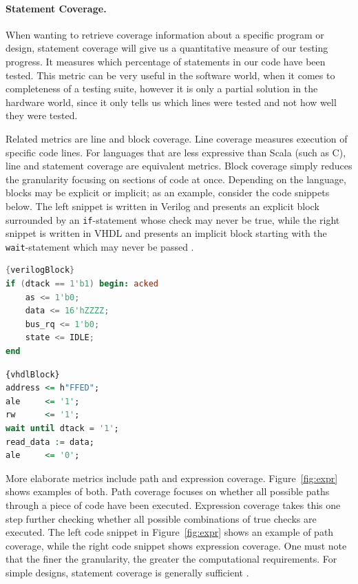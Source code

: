 \documentclass[runningheads]{llncs}
\begin{document}
\paragraph{Statement Coverage.} When wanting to retrieve coverage information about a specific program or design, statement coverage will give us a quantitative measure of our testing progress. It measures which percentage of statements in our code have been tested. This metric can be very useful in the software world, when it comes to completeness of a testing suite, however it is only a partial solution in the hardware world, since it only tells us which lines were tested and not how well they were tested.

Related metrics are line and block coverage. Line coverage measures execution of specific code lines. For languages that are less expressive than Scala (such as C), line and statement coverage are equivalent metrics. Block coverage simply reduces the granularity focusing on sections of code at once. Depending on the language, blocks may be explicit or implicit; as an example, consider the code snippets below. The left snippet is written in Verilog and presents an explicit block surrounded by an \texttt{if}-statement whose check may never be true, while the right snippet is written in VHDL and presents an implicit block starting with the \texttt{wait}-statement which may never be passed \cite{hdlverify}.

\noindent\begin{minipage}{.45\textwidth}
\begin{lstlisting}[language=verilog]{verilogBlock}
if (dtack == 1'b1) begin: acked
    as <= 1'b0;
    data <= 16'hZZZZ;
    bus_rq <= 1'b0;
    state <= IDLE;
end
\end{lstlisting}
\end{minipage}\hfill
\begin{minipage}{.45\textwidth}
\begin{lstlisting}[language=vhdl, firstnumber=1]{vhdlBlock}
address <= h"FFED";
ale     <= '1';
rw      <= '1';
wait until dtack = '1';
read_data := data;
ale     <= '0';
\end{lstlisting}
\end{minipage}

More elaborate metrics include path and expression coverage. Figure~\ref{fig:expr} shows examples of both. Path coverage focuses on whether all possible paths through a piece of code have been executed. 
Expression coverage takes this one step further checking whether all possible combinations of true checks are executed. The left code snippet in Figure~\ref{fig:expr} shows an example of path coverage, while the right code snippet shows expression coverage. One must note that the finer the granularity, the greater the computational requirements. For simple designs, statement coverage is generally sufficient \cite{hdlverify}.
\end{document}

